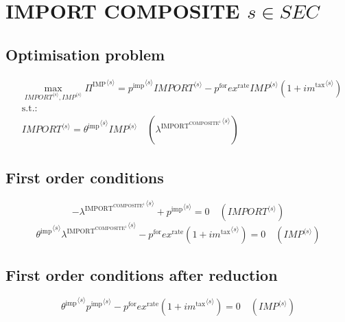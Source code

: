 \section{IMPORT COMPOSITE $s\in {S\!E\!C}$}

\subsection{Optimisation problem}

\begin{align}
&\max_{{{I\!M\!P\!O\!R\!T}}^{\langle s\rangle}, {{I\!M\!P}}^{\langle s\rangle}
} {\Pi^{\mathrm{IMP}}}^{\langle s\rangle} = {{p^{\mathrm{imp}}}^{\langle s\rangle}} {{{I\!M\!P\!O\!R\!T}}^{\langle s\rangle}} - {p^{\mathrm{for}}} {{e\!x}^{\mathrm{rate}}} {{{I\!M\!P}}^{\langle s\rangle}} \left(1 + {{i\!m}^{\mathrm{tax}}}^{\langle s\rangle}\right)\\
&\mathrm{s.t.:}\nonumber\\
& {{I\!M\!P\!O\!R\!T}}^{\langle s\rangle} = {{\theta^{\mathrm{imp}}}^{\langle s\rangle}} {{{I\!M\!P}}^{\langle s\rangle}} \quad \left({\lambda^{\mathrm{IMPORT}^{\mathrm{COMPOSITE}^{\mathrm{1}}}}}^{\langle s\rangle}\right)
\end{align}


\subsection{First order conditions}

\begin{equation}
-{\lambda^{\mathrm{IMPORT}^{\mathrm{COMPOSITE}^{\mathrm{1}}}}}^{\langle s\rangle} + {p^{\mathrm{imp}}}^{\langle s\rangle} = 0
 \quad \left({{I\!M\!P\!O\!R\!T}}^{\langle s\rangle}\right)
\end{equation}
\begin{equation}
{{\theta^{\mathrm{imp}}}^{\langle s\rangle}} {{\lambda^{\mathrm{IMPORT}^{\mathrm{COMPOSITE}^{\mathrm{1}}}}}^{\langle s\rangle}} - {p^{\mathrm{for}}} {{e\!x}^{\mathrm{rate}}} \left(1 + {{i\!m}^{\mathrm{tax}}}^{\langle s\rangle}\right) = 0
 \quad \left({{I\!M\!P}}^{\langle s\rangle}\right)
\end{equation}


\subsection{First order conditions after reduction}

\begin{equation}
{{\theta^{\mathrm{imp}}}^{\langle s\rangle}} {{p^{\mathrm{imp}}}^{\langle s\rangle}} - {p^{\mathrm{for}}} {{e\!x}^{\mathrm{rate}}} \left(1 + {{i\!m}^{\mathrm{tax}}}^{\langle s\rangle}\right) = 0
 \quad \left({{I\!M\!P}}^{\langle s\rangle}\right)
\end{equation}




